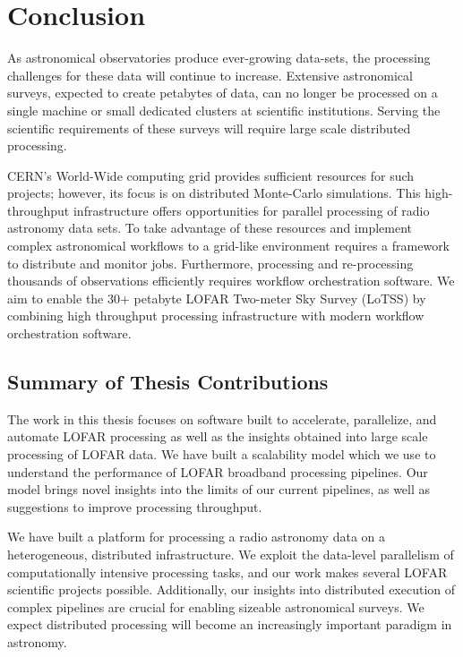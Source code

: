 \chapter{Conclusion}\label{ch:conclusions}


As astronomical observatories produce ever-growing data-sets, the processing challenges for these data will continue  to increase. Extensive astronomical surveys, expected to create petabytes of data, can no longer be processed on a single machine or small dedicated clusters at scientific institutions. Serving the scientific requirements of these surveys will require large scale distributed processing. 

CERN's World-Wide computing grid provides sufficient resources for such projects; however, its focus is on distributed Monte-Carlo simulations. This high-throughput infrastructure offers opportunities for parallel processing of radio astronomy data sets. To take advantage of these resources and implement complex astronomical workflows to a grid-like environment requires a framework to distribute and monitor jobs. Furthermore, processing and re-processing thousands of observations efficiently requires workflow orchestration software. We aim to enable the 30+ petabyte LOFAR Two-meter Sky Survey (\Gls{LoTSS}) by combining high throughput processing infrastructure with modern workflow orchestration software. 

\section{Summary of Thesis Contributions}

The work in this thesis focuses on software built to accelerate, parallelize, and automate LOFAR processing as well as the insights obtained into large scale processing of LOFAR data. We have built a scalability model which we use to understand the performance of LOFAR broadband processing pipelines. Our model brings novel insights into the limits of our current pipelines, as well as suggestions to improve processing throughput. 

We have built a platform for processing a radio astronomy data on a heterogeneous, distributed infrastructure. We exploit the data-level parallelism of computationally intensive processing tasks, and our work makes several LOFAR scientific projects possible. Additionally, our insights into distributed execution of complex pipelines are crucial for enabling sizeable astronomical surveys. We expect distributed processing will become an increasingly important paradigm in astronomy. 

